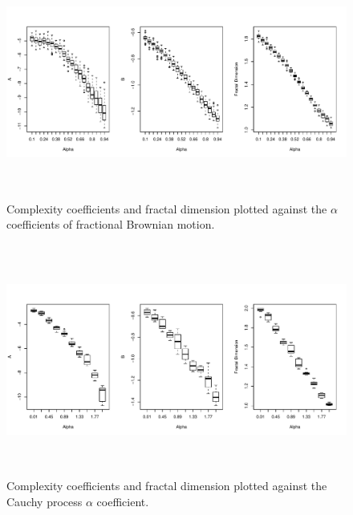 \begin{figure}[!htbp]
  \begin{center}
  \includegraphics[height = 3in, width =6in, keepaspectratio]{./figs/fBm-coeffs-boxplots.pdf}
  \end{center}
   \label{fig:fbm-boxplots}
  \caption{Complexity coefficients and fractal dimension plotted against the $\alpha$ coefficients of fractional Brownian motion.} 
\end{figure}

\begin{figure}[!htbp]
  \begin{center}
  \includegraphics[height = 3in, width =6in, keepaspectratio]{./figs/cauchy-boxplots.pdf}
  \end{center}
  \caption{Complexity coefficients and fractal dimension plotted against the Cauchy process $\alpha$ coefficient.} 
     \label{fig:cauchy-boxplots}
\end{figure}

